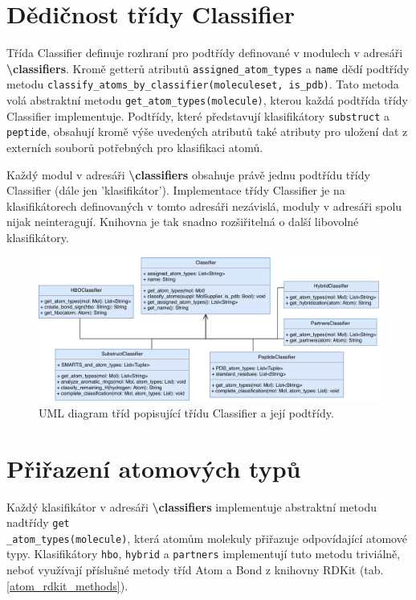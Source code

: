 \section{Dědičnost třídy Classifier}
Třída Classifier definuje rozhraní pro podtřídy definované v modulech v adresáři \textbf{\textbackslash classifiers}. %
Kromě getterů atribu\-tů \verb|assigned_atom_types| a \verb|name| dědí podtřídy metodu \verb|classify_atoms_by_classifier(moleculeset, is_pdb)|. Ta\-to metoda volá abstra\-ktní metodu \verb|get_atom_types(molecule)|, kterou každá podtřída třídy Classifier implementuje. Podtřídy, které představují klasifikátory \verb|substruct| a \verb|peptide|, obsahují kromě výše uvedených atributů také atributy pro uložení dat z externích souborů potřebných pro klasifikaci atomů.

Každý modul v adresáři \textbf{\textbackslash classifiers} obsahuje právě jednu podtřídu třídy Classifier (dále jen 'klasifikátor'). Implementace třídy Classifier je na klasifikátorech definovaných v tomto adresáři nezávislá, moduly v adresáři spolu nijak neinteragují. Knihovna je tak snadno rozšiřitelná o další libovolné klasifikátory. 

\bigskip
\begin{figure}[h]
    \centering
    \includegraphics[width=15cm]{pictures/diagram.png}
    \caption{UML diagram tříd popisující třídu Classifier a její podtřídy.}
    \label{classes_UML}
\end{figure}

    
\section{Přiřazení atomových typů}
Každý klasifikátor v adresáři \textbf{\textbackslash classifiers} implementuje abstraktní metodu nadtřídy \verb|get|\\ \verb|_atom_types(molecule)|, která atomům molekuly přiřazuje odpovídající atomové ty\-py. Klasifikátory \verb|hbo|, \verb|hybrid| a \verb|partners| implementují tuto metodu triviálně, neboť využívají příslušné metody tříd Atom a Bond z knihovny RDKit (tab.  \ref{atom_rdkit_methods}). 

